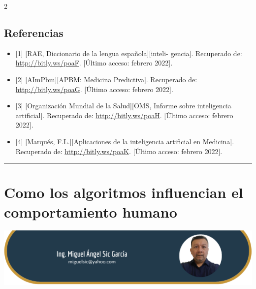 \documentclass[12pt,spanish,Letterpaper,openany]{book}
\newcommand{\HRule}{\begin{center}\rule{0.5\linewidth}{0.2mm}\end{center}}
\begin{document}
\begin {multicols}{2}
\hypertarget{referencias-2}{%
\section{Referencias}\label{referencias-2}}

\begin{itemize}
\item
  {[}1{]} {[}RAE, Diccionario de la lengua española{]}{[}inteli-
  gencia{]}. Recuperado de: \url{http://bitly.ws/poaF}. {[}Último acceso: febrero 2022{]}.
\item
  {[}2{]} {[}AImPbm{]}{[}APBM: Medicina Predictiva{]}. Recuperado de: \url{http://bitly.ws/poaG}. {[}Último acceso: febrero 2022{]}.
\item
  {[}3{]} {[}Organización Mundial de la Salud{]}{[}OMS, Informe sobre inteligencia artificial{]}. Recuperado de: \url{http://bitly.ws/poaH}. {[}Último acceso: febrero 2022{]}.
\item
  {[}4{]} {[}Marqués, F.L.{]}{[}Aplicaciones de la inteligencia artificial en Medicina{]}. Recuperado de: \url{http://bitly.ws/poaK}. {[}Último acceso: febrero 2022{]}.
\end{itemize}

\end {multicols}
\medskip
\HRule
\medskip

\hypertarget{miguelsic}{%
\chapter{Como los algoritmos influencian el comportamiento humano}\label{miguelsic}}

\begin{center}\includegraphics[width=1\linewidth]{images/mSic_image1} \end{center}
\end{document}
